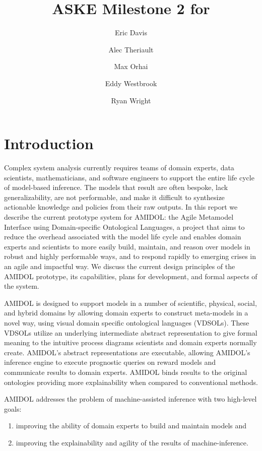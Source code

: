 \documentclass[11pt]{article}
\date{\vspace{-5ex}}
\author[1]{Eric Davis}
\author[1]{Alec Theriault}
\author[1]{Max Orhai}
\author[1]{Eddy Westbrook}
\author[1]{Ryan Wright}
\affil[1]{Galois, Inc}
\title{ASKE Milestone 2 for \amidol{}}
\newcommand{\amidol}{\textsc{AMIDOL}}
\begin{document}
\maketitle
\vspace{10pt}

\section{Introduction}

Complex system analysis currently requires teams of domain experts, data scientists, mathematicians, and software engineers to support the entire life cycle of model-based inference.  The models that result are often bespoke, lack generalizability, are not performable, and make it difficult to synthesize actionable knowledge and policies from their raw outputs.  In this report we describe the current prototype system for \amidol{}: the Agile Metamodel Interface using Domain-specific Ontological Languages, a project that aims to reduce the overhead associated with the model life cycle and enables domain experts and scientists to more easily build, maintain, and reason over models in robust and highly performable ways, and to respond rapidly to emerging crises in an agile and impactful way.  We discuss the current design principles of the \amidol{} prototype, its capabilities, plans for development, and formal aspects of the system.

\amidol{} is designed to support models in a number of scientific, physical, social, and hybrid domains by allowing domain experts to construct meta-models in a novel way, using visual domain specific ontological languages (VDSOLs).  These VDSOLs utilize an underlying intermediate abstract representation to give formal meaning to the intuitive process diagrams scientists and domain experts normally create.  \amidol{}'s abstract representations are executable, allowing \amidol{}'s inference engine to execute prognostic queries on reward models and communicate results to domain experts. \amidol{} binds results to the original ontologies providing more explainability when compared to conventional methods.

\amidol{} addresses the problem of machine-assisted inference with two high-level goals:

\begin{enumerate}
\item improving the ability of domain experts to build and maintain models and
\item improving the explainability and agility of the results of machine-inference.
\end{enumerate}
\end{document}
